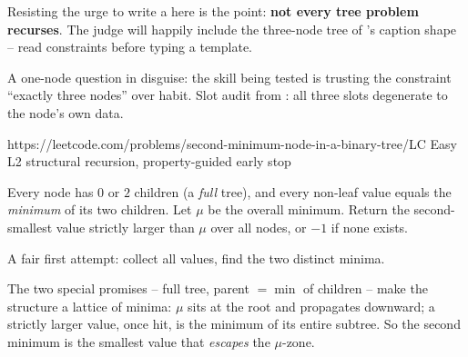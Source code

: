 
\begin{warningbox}
Resisting the urge to write a  here is the point: \textbf{not every
tree problem recurses}. The judge will happily include the three-node tree of
's caption shape -- read constraints before typing
a template.
\end{warningbox}

\begin{insightbox}
A one-node question in disguise: the skill being tested is trusting the
constraint ``exactly three nodes'' over habit. Slot audit from
: all three slots degenerate to the node's own data.
\end{insightbox}

  {https://leetcode.com/problems/second-minimum-node-in-a-binary-tree/}{LC Easy L2}
  {structural recursion, property-guided early stop}

\begin{problemstatement}
Every node has $0$ or $2$ children (a \emph{full} tree), and every non-leaf value
equals the \emph{minimum} of its two children. Let $\mu$ be the overall minimum.
Return the second-smallest value strictly larger than $\mu$ over all nodes, or
$-1$ if none exists.
\end{problemstatement}

\begin{attemptgate}
A fair first attempt: collect all values, find the two distinct minima.
\end{attemptgate}

The two special promises -- full tree, parent $=\min$ of children -- make the
structure a lattice of minima: $\mu$ sits at the root and propagates downward; a
strictly larger value, once hit, is the minimum of its entire subtree. So the
second minimum is the smallest value that \emph{escapes} the $\mu$-zone.


